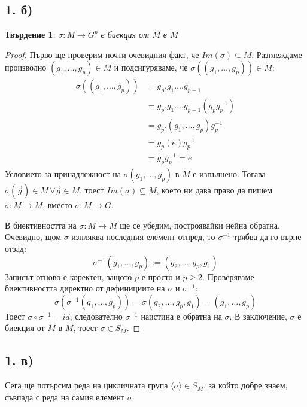 \documentclass{article}
\newtheorem*{prop}{Твърдение}
\theoremstyle{definition}
\newcommand{\grsigma}[0]{{\langle \sigma \rangle}}
\begin{document}
\subsection*{1. б)}
\begin{prop}
$\sigma : M \to G^p$ е биекция от $M$ в $M$
\end{prop}
\begin{proof}
Първо ще проверим почти очевидния факт, че $Im(\sigma) \subseteq M$.
Разглеждаме произволно $(g_1,\dots, g_p) \in M$ и подсигуряваме, че ${\sigma((g_1,\dots, g_p)) \in M}$:
\begin{align*}
    \sigma((g_1,\dots, g_p)) &= g_p.g_1\dots.g_{p-1}\\
                             &= g_p.g_1\dots.g_{p-1}(g_p g_p^{-1})\\
                             &= g_p.(g_1,\dots, g_p)g_p^{-1}\\
                             &= g_p(e)g_p^{-1} \\
                             &= g_p g_p^{-1} = e
\end{align*}
Условието за принадлежност на $\sigma (g_1,\dots, g_p)$ в $M$ е изпълнено.
Тогава $\sigma(\vec g) \in M \, \forall \vec g \in M$, тоест $Im(\sigma) \subseteq M$, което ни дава право да пишем $\sigma : M \to M$, вместо $\sigma : M \to G$.

В биективността на $\sigma : M \to M$ ще се убедим, построявайки нейна обратна. Очевидно, щом $\sigma$ изпляква последния елемент отпред, то $\sigma^{-1}$ трябва да го върне отзад:
\begin{equation*}
    \sigma^{-1}(g_1, \dots, g_p) := (g_2, \dots, g_p, g_1)
\end{equation*}
Записът отново е коректен, защото $p$ е просто и $p \ge 2$.
Проверяваме биективността директно от дефинициите на $\sigma$ и $\sigma^{-1}$:
\begin{equation*}
    \sigma(\sigma^{-1}(g_1,\dots,g_p)) = \sigma(g_2,\dots,g_p,g_1) = (g_1, \dots, g_p)
\end{equation*}
Тоест $\sigma \circ \sigma^{-1} = id$, следователно $\sigma^{-1}$ наистина е обратна на $\sigma$. В заключение, $\sigma$ е биекция от $M$ в $M$, тоест $\sigma \in S_M$.
\end{proof}

\subsection*{1. в)}
Сега ще потърсим реда на цикличната група $\grsigma \in S_M$, за който добре знаем, съвпада с реда на самия елемент $\sigma$.
\end{document}
